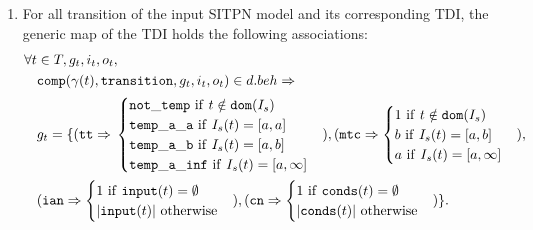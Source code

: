 \begin{definition}
\begin{enumerate}[resume]
  \item\label{it:tdi-gen-map} For all transition of the input SITPN model and its
    corresponding TDI, the generic map of the TDI holds the following
    associations:
    \begin{equation*}
      \begin{aligned}[t]
        \forall{}t&\in{}T,g_t,i_t,o_t, \\
                  & \mathtt{comp}(\gamma(t),\mathtt{transition},g_t,i_t,o_t)\in{}d.beh\Rightarrow \\
                  & g_t=\{(\mathtt{tt}\Rightarrow{}
                    \begin{cases}
                      \mathtt{not\_temp}~\mathrm{if}~t\notin{}\mathtt{dom}(I_s) \\
                      \mathtt{temp\_a\_a}~\mathrm{if}~I_s(t)=[a,a] \\
                      \mathtt{temp\_a\_b}~\mathrm{if}~I_s(t)=[a,b] \\
                      \mathtt{temp\_a\_inf}~\mathrm{if}~I_s(t)=[a,\infty] \\
                    \end{cases}),
        (\mathtt{mtc}\Rightarrow
        \begin{cases}
          1~\mathrm{if}~t\notin{}\mathtt{dom}(I_s) \\
          b~\mathrm{if}~I_s(t)=[a,b] \\
          a~\mathrm{if}~I_s(t)=[a,\infty] \\
        \end{cases}), \\
                  & (\mathtt{ian}\Rightarrow
                    \begin{cases}
                      1~\mathrm{if}~\mathtt{input}(t)=\emptyset \\
                      \vert{}\mathtt{input}(t)\vert~\mathrm{otherwise} \\
                    \end{cases}), 
        (\mathtt{cn}\Rightarrow
        \begin{cases}
          1~\mathrm{if}~\mathtt{conds}(t)=\emptyset \\
          \vert{}\mathtt{conds}(t)\vert~\mathrm{otherwise} \\
        \end{cases})\}. \\
      \end{aligned}
    \end{equation*}
    

\end{enumerate}
\end{definition}
